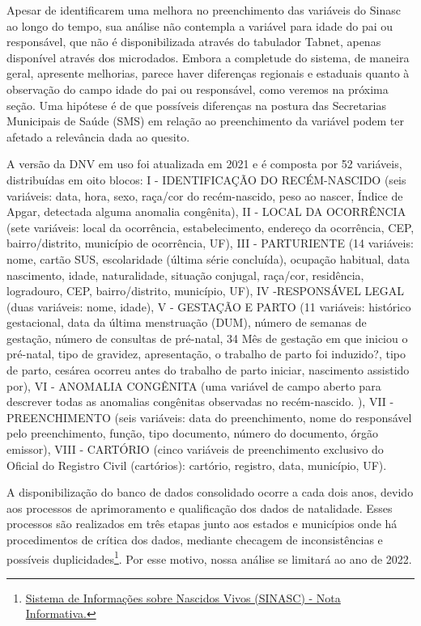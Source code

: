 Apesar de  identificarem uma melhora no preenchimento das variáveis do Sinasc ao longo do tempo, sua análise não contempla a variável para idade do pai ou responsável, que não é disponibilizada através do tabulador Tabnet, apenas disponível através dos microdados. Embora a completude do sistema, de maneira geral, apresente melhorias, parece haver diferenças regionais e estaduais quanto à observação do campo idade do pai ou responsável, como veremos na próxima seção. Uma hipótese é de que possíveis diferenças na postura das Secretarias Municipais de Saúde (SMS) em relação ao preenchimento da variável podem ter afetado a relevância dada ao quesito.

A versão da DNV em uso foi atualizada em 2021 e é composta por 52 variáveis, distribuídas em oito blocos: I - IDENTIFICAÇÃO DO RECÉM-NASCIDO (seis variáveis: data, hora, sexo, raça/cor do recém-nascido, peso ao nascer, Índice de Apgar, detectada alguma anomalia congênita), II - LOCAL DA OCORRÊNCIA (sete variáveis: local da ocorrência, estabelecimento, endereço da ocorrência, CEP, bairro/distrito, município de ocorrência, UF), III - PARTURIENTE (14 variáveis: nome, cartão SUS, escolaridade (última série concluída), ocupação habitual, data nascimento, idade, naturalidade, situação conjugal, raça/cor, residência, logradouro, CEP, bairro/distrito, município, UF), IV -RESPONSÁVEL LEGAL (duas variáveis: nome, idade), V - GESTAÇÃO E PARTO (11 variáveis: histórico gestacional, data da última menstruação (DUM), número de semanas de gestação, número de consultas de pré-natal, 34 Mês de gestação em que iniciou o pré-natal, tipo de gravidez, apresentação, o trabalho de parto foi induzido?, tipo de parto, cesárea ocorreu antes do trabalho de parto iniciar, nascimento assistido por), VI - ANOMALIA CONGÊNITA (uma variável de campo aberto para descrever todas as anomalias congênitas observadas no recém-nascido. ), VII - PREENCHIMENTO (seis variáveis: data do preenchimento, nome do responsável pelo preenchimento, função, tipo documento, número do documento, órgão emissor), VIII - CARTÓRIO (cinco variáveis de preenchimento exclusivo do Oficial do Registro Civil (cartórios): cartório, registro, data, município, UF)\cite{BRmanualDNV2022}.

A disponibilização do banco de dados consolidado ocorre a cada dois anos, devido aos processos de aprimoramento e qualificação dos dados de natalidade. Esses processos são realizados em três etapas junto aos estados e municípios onde há procedimentos de crítica dos dados, mediante checagem de inconsistências e possíveis duplicidades\footnote{\href{https://svs.aids.gov.br/daent/centrais-de-conteudos/dados-abertos/sinasc/}{Sistema de Informações sobre Nascidos Vivos (SINASC) - Nota Informativa.}}. Por esse motivo, nossa análise se limitará ao ano de 2022.
